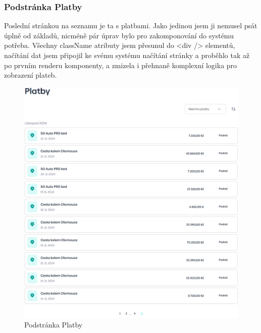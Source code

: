 \subsubsection{Podstránka Platby}
Poslední stránkou na seznamu je ta s platbami. Jako jedinou jsem ji nemusel psát úplně od základů, nicméně pár úprav bylo pro zakomponování do systému potřeba. Všechny className atributy jsem přesunul do <div /> elementů, načítání dat jsem připojil ke svému systému načítání stránky a proběhlo tak až po prvním renderu komponenty, a zmizela i přehnaně komplexní logika pro zobrazení plateb.
\\
\begin{figure}[!h]
    \centering
    \includegraphics[width=0.9\linewidth]{obrazky/platby.png}
    \caption{Podstránka Platby}
    \label{fig:enter-label}
\end{figure}
